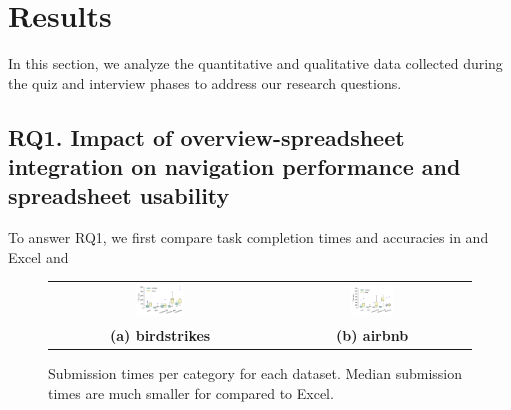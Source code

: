 
\section{Results}
\label{sec:results}
In this section, we analyze the quantitative and 
qualitative data collected during the quiz and interview phases 
to address our research questions. 

\subsection{RQ1. Impact of overview-spreadsheet integration on navigation performance and spreadsheet usability}
\label{sec:rq1}
To answer RQ1, we first compare task completion times  
and accuracies in \noah and Excel and   
\begin{figure}[t]
   \centering
\begin{tabular}{c c}  %
 \includegraphics[width=0.23\textwidth,trim={18 20 20 15},clip]{images/bird_box.pdf} &
   \includegraphics[width=0.23\textwidth,trim={18 20 20 15},clip]{images/airbnb_box.pdf} \\
   \textbf{(a) birdstrikes} & \textbf{(b) airbnb} \\
\end{tabular}
\caption{Submission times per category for each dataset. Median submission times are much smaller for \noah compared to Excel.}
\label{fig:timeBox}
\end{figure}

